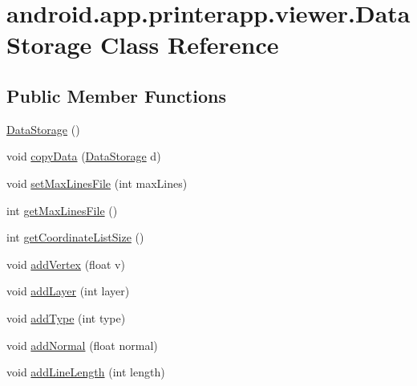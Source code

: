 \hypertarget{classandroid_1_1app_1_1printerapp_1_1viewer_1_1_data_storage}{}\section{android.\+app.\+printerapp.\+viewer.\+Data\+Storage Class Reference}
\label{classandroid_1_1app_1_1printerapp_1_1viewer_1_1_data_storage}
\subsection*{Public Member Functions}
\begin{DoxyCompactItemize}
\item 
\hyperlink{classandroid_1_1app_1_1printerapp_1_1viewer_1_1_data_storage_afbc6f50359136d2d9f94ec79457202a5}{Data\+Storage} ()
\item 
void \hyperlink{classandroid_1_1app_1_1printerapp_1_1viewer_1_1_data_storage_a1060a073989cc7911f7054549abd3f49}{copy\+Data} (\hyperlink{classandroid_1_1app_1_1printerapp_1_1viewer_1_1_data_storage}{Data\+Storage} d)
\item 
void \hyperlink{classandroid_1_1app_1_1printerapp_1_1viewer_1_1_data_storage_a932fc7b7a1b3e3cc51054aedce8e9fb2}{set\+Max\+Lines\+File} (int max\+Lines)
\item 
int \hyperlink{classandroid_1_1app_1_1printerapp_1_1viewer_1_1_data_storage_a3b9c9a694ce5543b3f98d98d4b534a5d}{get\+Max\+Lines\+File} ()
\item 
int \hyperlink{classandroid_1_1app_1_1printerapp_1_1viewer_1_1_data_storage_adf93b50210f6040efd7471a5ff0a933e}{get\+Coordinate\+List\+Size} ()
\item 
void \hyperlink{classandroid_1_1app_1_1printerapp_1_1viewer_1_1_data_storage_a5e1389736b39e7d8ffda6e4024e6b5b8}{add\+Vertex} (float v)
\item 
void \hyperlink{classandroid_1_1app_1_1printerapp_1_1viewer_1_1_data_storage_aa0dbb5d9330abf4c223da01fe903a74a}{add\+Layer} (int layer)
\item 
void \hyperlink{classandroid_1_1app_1_1printerapp_1_1viewer_1_1_data_storage_a3dd88df19fa8ea35c05641ebccf27887}{add\+Type} (int type)
\item 
void \hyperlink{classandroid_1_1app_1_1printerapp_1_1viewer_1_1_data_storage_a0c88292979f62f7bfe8703833141f881}{add\+Normal} (float normal)
\item 
void \hyperlink{classandroid_1_1app_1_1printerapp_1_1viewer_1_1_data_storage_aecc86c12525eda70a0a1115848ac8af3}{add\+Line\+Length} (int length)

\end{DoxyCompactItemize}
